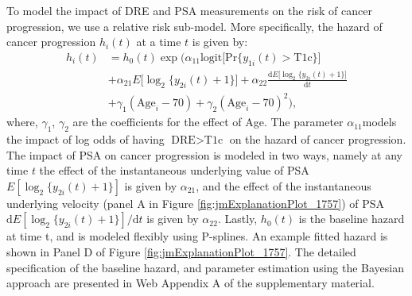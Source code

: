 To model the impact of DRE and PSA measurements on the risk of cancer progression, we use a relative risk sub-model. More specifically, the hazard of cancer progression $h_i(t)$ at a time $t$ is given by:
\begin{equation}
\label{eq:rel_risk_model}
\begin{aligned}
    h_i(t) &= h_0(t) \exp\Big(\alpha_{11} \mbox{logit} \big[\mbox{Pr}\{y_{1i}(t) > \mbox{T1c}\}\big]\\
    &+ \alpha_{21} E\big[\log_2 \big\{y_{2i}(t) + 1\big\}\big] + \alpha_{22} \frac{\mathrm{d}{E\big[\log_2 \big\{y_{2i}(t) + 1\big\}\big]}}{\mathrm{d}{t}}\\
    &+ \gamma_1 (\mbox{Age}_i-70) + \gamma_2 (\mbox{Age}_i-70)^2 \Big),
    \end{aligned}
\end{equation}
where, $\gamma_1$, $\gamma_2$ are the coefficients for the effect of Age. The parameter $\alpha_{11}$models the impact of log odds of having $\mbox{DRE} > \mbox{T1c}$ on the hazard of cancer progression. The impact of PSA on cancer progression is modeled in two ways, namely at any time $t$ the effect of the instantaneous underlying value of PSA $E[\log_2 \{y_{2i}(t) + 1\}]$ is given by $\alpha_{21}$, and the effect of the instantaneous underlying velocity (panel A in Figure \ref{fig:jmExplanationPlot_1757}) of PSA $\mathrm{d}{E[\log_2 \{y_{2i}(t) + 1\}]}/\mathrm{d}{t}$ is given by $\alpha_{22}$. Lastly, $h_0(t)$ is the baseline hazard at time t, and is modeled flexibly using P-splines. An example fitted hazard is shown in Panel D of Figure \ref{fig:jmExplanationPlot_1757}.  The detailed specification of the baseline hazard, and parameter estimation using the Bayesian approach are presented in Web Appendix A of the supplementary material.


